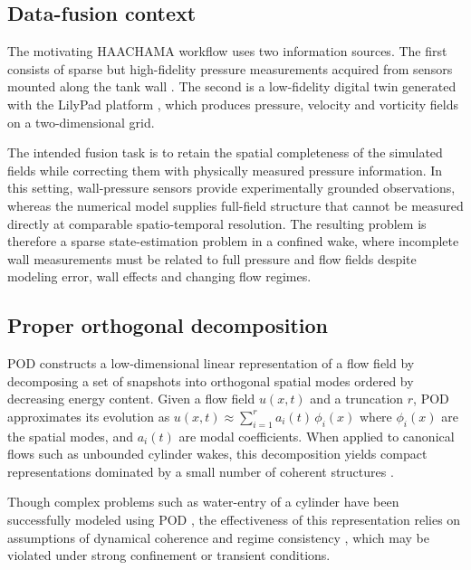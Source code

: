 \documentclass[preprint,12pt]{elsarticle}
\begin{document}
\subsection{Data-fusion context}
\label{subsec2.1}

The motivating HAACHAMA workflow uses two information sources. The first consists of sparse but high-fidelity pressure measurements acquired from sensors mounted along the tank wall \citep{Porcon2024}. The second is a low-fidelity digital twin generated with the LilyPad platform \citep{Maertens2015}, which produces pressure, velocity and vorticity fields on a two-dimensional grid. 

The intended fusion task is to retain the spatial completeness of the simulated fields while correcting them with physically measured pressure information. In this setting, wall-pressure sensors provide experimentally grounded observations, whereas the numerical model supplies full-field structure that cannot be measured directly at comparable spatio-temporal resolution. The resulting problem is therefore a sparse state-estimation problem in a confined wake, where incomplete wall measurements must be related to full pressure and flow fields despite modeling error, wall effects and changing flow regimes.

\subsection{Proper orthogonal decomposition}
\label{subsec2.2}
POD constructs a low-dimensional linear representation of a flow field by decomposing a set of snapshots into orthogonal spatial modes ordered by decreasing energy content. Given a flow field $u(x,t)$ and a truncation $r$, POD approximates its evolution as $u(x,t) \approx \sum\nolimits_{i=1}^r a_i(t)\,\phi_i(x)$ where $\phi_i(x)$ are the spatial modes, and $a_i(t)$ are modal coefficients. When applied to canonical flows such as unbounded cylinder wakes, this decomposition yields compact representations dominated by a small number of coherent structures \citep{Noack2003,Tadmor2010}.

Though complex problems such as water-entry of a cylinder have been successfully modeled using POD \citep{Sha2023}, the effectiveness of this representation relies on assumptions of dynamical coherence and regime consistency \citep{Loiseau2021}, which may be violated under strong confinement or transient conditions.
\end{document}
